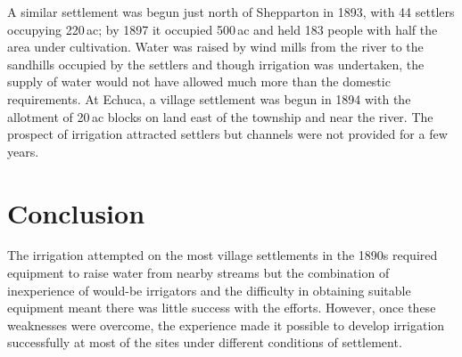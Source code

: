 A similar settlement was begun just north of Shepparton in 1893, with
44 settlers occupying 220\,ac; by 1897 it occupied 500\,ac and held
183 people with half the area under cultivation.  Water was raised by
wind mills from the river to the sandhills occupied by the settlers
and though irrigation was undertaken, the supply of water would not
have allowed much more than the domestic
requirements.  At Echuca, a village
settlement was begun in 1894 with the allotment of 20\,ac blocks on
land east of the township and near the river.  The prospect of
irrigation attracted settlers but channels were not provided for a few
years.

\section*{Conclusion}

The irrigation attempted on the most village settlements in the 1890s
required equipment to raise water from nearby streams but the
combination of inexperience of would-be irrigators and the difficulty
in obtaining suitable equipment meant there was little success with
the efforts.  However, once these weaknesses were overcome, the
experience made it possible to develop irrigation successfully at most
of the sites under different conditions of settlement.

